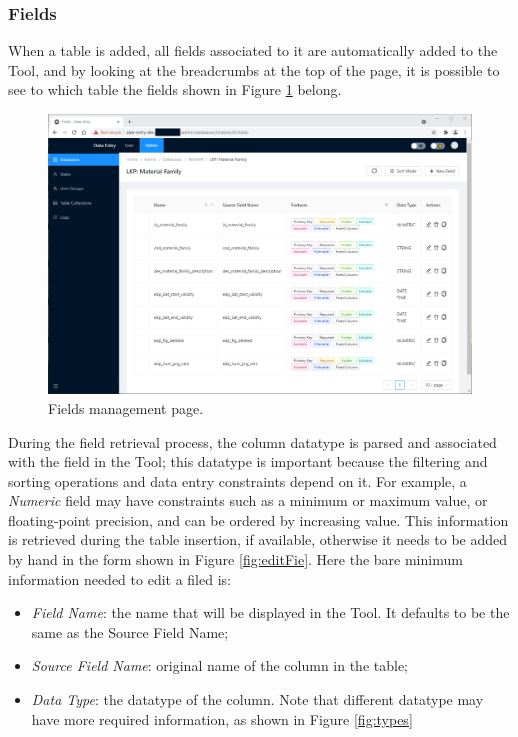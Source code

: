 \subsubsection{Fields}
When a table is added, all fields associated to it are automatically added to the Tool, and by looking at the breadcrumbs at the top of the page, it is possible to see to which table the fields shown in Figure \ref{fig:fields} belong. 
\begin{figure}[!htb]
    \centering
    \includegraphics[width=15.8cm]{chapters/images/ch_3/FE/Admin/fields.png}
    \caption{Fields management page.}
    \label{fig:fields}
\end{figure}

During the field retrieval process, the column datatype is parsed and associated with the field in the Tool; this datatype is important because the filtering and sorting operations and data entry constraints depend on it. For example, a \emph{Numeric} field may have constraints such as a minimum or maximum value, or floating-point precision, and can be ordered by increasing value. This information is retrieved during the table insertion, if available, otherwise it needs to be added by hand in the form shown in Figure \ref{fig:editFie}. Here the bare minimum information needed to edit a filed is:
\begin{itemize}
    \item \emph{Field Name}: the name that will be displayed in the Tool. It defaults to be the same as the Source Field Name;
    \item \emph{Source Field Name}: original name of the column in the table;
    \item \emph{Data Type}: the datatype of the column. Note that different datatype may have more required information, as shown in Figure \ref{fig:types}
\end{itemize}

